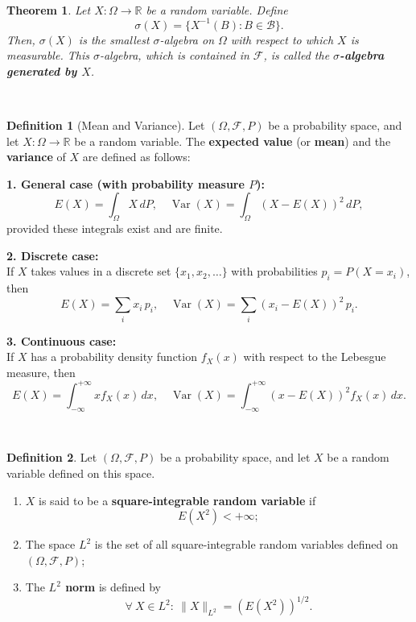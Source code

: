 \documentclass[
  11pt,
  a4paper,
]{book}
\newtheorem{theorem}{Theorem}[chapter]
\theoremstyle{definition}
\newtheorem{definition}{Definition}[chapter]
\theoremstyle{definition}
\theoremstyle{definition}
\theoremstyle{definition}
\theoremstyle{remark}
\begin{document}
\(\,\)

\begin{theorem}
Let \(X: \Omega \to \mathbb{R}\) be a random variable. Define
\[
\sigma(X) = \{ X^{-1}(B) : B \in \mathcal{B} \}.
\]
Then, \(\sigma(X)\) is the smallest \(\sigma\)-algebra on \(\Omega\) with respect to which \(X\) is measurable. This \(\sigma\)-algebra, which is contained in \(\mathcal{F}\), is called the \textbf{\(\sigma\)-algebra generated by \(X\)}.
\end{theorem}

\(\,\)

\begin{definition}[Mean and Variance]
Let \((\Omega, \mathcal{F}, P)\) be a probability space, and let \(X: \Omega \rightarrow \mathbb{R}\) be a random variable. The \textbf{expected value} (or \textbf{mean}) and the \textbf{variance} of \(X\) are defined as follows:

\textbf{1. General case (with probability measure \(P\)):}
\[
E(X) = \int_\Omega X \, dP, \quad 
\operatorname{Var}(X) = \int_\Omega (X - E(X))^2 \, dP,
\]
provided these integrals exist and are finite.

\textbf{2. Discrete case:}\\
If \(X\) takes values in a discrete set \(\{x_1, x_2, \dots\}\) with probabilities \(p_i = P(X = x_i)\), then
\[
E(X) = \sum_i x_i \, p_i, \quad 
\operatorname{Var}(X) = \sum_i (x_i - E(X))^2 \, p_i.
\]

\textbf{3. Continuous case:}\\
If \(X\) has a probability density function \(f_X(x)\) with respect to the Lebesgue measure, then
\[
E(X) = \int_{-\infty}^{+\infty} x f_X(x) \, dx, \quad 
\operatorname{Var}(X) = \int_{-\infty}^{+\infty} (x - E(X))^2 f_X(x) \, dx.
\]
\end{definition}

\(\,\)

\begin{definition}

Let \((\Omega, \mathcal{F}, P)\) be a probability space, and let \(X\) be a random variable defined on this space.

\begin{enumerate}
\def\labelenumi{\arabic{enumi}.}
\item
  \(X\) is said to be a \textbf{square-integrable random variable} if\\
  \[
  E(X^2) < +\infty;
  \]
\item
  The space \textbf{\(L^2\)} is the set of all square-integrable random variables defined on \((\Omega, \mathcal{F}, P)\);
\item
  The \textbf{\(L^2\) norm} is defined by
  \[
  \forall ~ X \in L^2:~ \|X\|_{L^2} = \left(E(X^2)\right)^{1/2}.
  \]
\end{enumerate}

\end{definition}
\end{document}
